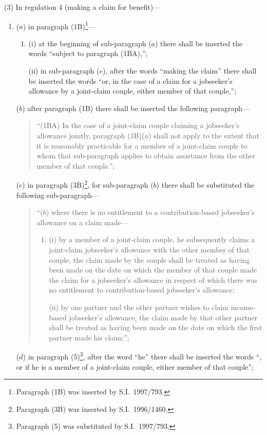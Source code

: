 \documentclass[12pt,a4paper]{article}
\begin{document}
(3) In regulation 4 (making a claim for benefit)—
\begin{enumerate}\item[]
($a$) in paragraph (1B)\footnote{Paragraph (1B) was inserted by S.I.\ 1997/793.}—
\begin{enumerate}\item[]
(i) at the beginning of sub-paragraph ($a$)  there shall be inserted the words “subject to paragraph (1BA),”;

(ii) in sub-paragraph ($e$), after the words “making the claim” there shall be inserted the words “or, in the case of a claim for a jobseeker’s allowance by a joint-claim couple, either member of that couple,”;
\end{enumerate}

($b$) after paragraph (1B) there shall be inserted the following paragraph—
\begin{quotation}
“(1BA) In the case of a joint-claim couple claiming a jobseeker’s allowance jointly, paragraph (1B)($a$)  shall not apply to the extent that it is reasonably practicable for a member of a joint-claim couple to whom that sub-paragraph applies to obtain assistance from the other member of that couple.”;
\end{quotation}

($c$) in paragraph (3B)\footnote{Paragraph (3B) was inserted by S.I.\ 1996/1460.}, for sub-paragraph ($b$)  there shall be substituted the following sub-paragraph—
\begin{quotation}
“($b$) where there is no entitlement to a contribution-based jobseeker’s allowance on a claim made—
\begin{enumerate}\item[]
(i) by a member of a joint-claim couple, he subsequently claims a joint-claim jobseeker’s allowance with the other member of that couple, the claim made by the couple shall be treated as having been made on the date on which the member of that couple made the claim for a jobseeker’s allowance in respect of which there was no entitlement to contribution-based jobseeker’s allowance;

(ii) by one partner and the other partner wishes to claim income-based jobseeker’s allowance, the claim made by that other partner shall be treated as having been made on the date on which the first partner made his claim;”;
\end{enumerate}
\end{quotation}

($d$) in paragraph (5)\footnote{Paragraph (5) was substituted by S.I.\ 1997/793.}, after the word “he” there shall be inserted the words “, or if he is a member of a joint-claim couple, either member of that couple”;


\end{enumerate}
\end{document}
